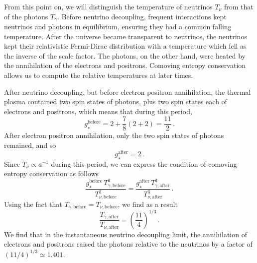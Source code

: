 From this point on, we will distinguish the temperature of neutrinos $T_\nu$ from that of the photons $T_\gamma$.  Before neutrino decoupling, frequent interactions kept neutrinos and photons in equilibrium, ensuring they had a common falling temperature.  After the universe became transparent to neutrinos, the neutrinos kept their relativistic Fermi-Dirac distribution with a temperature which fell as the inverse of the scale factor.  The photons, on the other hand, were heated by the annihilation of the electrons and positrons.  Comoving entropy conservation allows us to compute the relative temperatures at later times.

After neutrino decoupling, but before electron positron annihilation, the thermal plasma contained two spin states of photons, plus two spin states each of electrons and positrons, which means that during this period,
\begin{equation}
	g_{\star}^{\mathrm{before}} = 2 + \frac{7}{8}(2+2) = \frac{11}{2} \, .
\end{equation}
After electron positron annihilation, only the two spin states of photons remained, and so
\begin{equation}
	g_\star^{\mathrm{after}} = 2 \, .
\end{equation}
Since $T_\nu\propto a^{-1}$ during this period, we can express the condition of comoving entropy conservation as follows
\begin{equation}
	\frac{g_{\star}^{\mathrm{before}} \, T_{\gamma,\mathrm{before}}^3}{T_{\nu,\mathrm{before}}^3} = \frac{g_\star^{\mathrm{after}} \, T_{\gamma,\mathrm{after}}^3}{T_{\nu,\mathrm{after}}^3} \, .
\end{equation}
Using the fact that $T_{\gamma,\mathrm{before}} = T_{\nu,\mathrm{before}}$, we find as a result
\begin{equation}
	\frac{T_{\gamma,\mathrm{after}}}{T_{\nu,\mathrm{after}}} = \left(\frac{11}{4}\right)^{1/3} \, .
\end{equation}
We find that in the instantaneous neutrino decoupling limit, the annihilation of electrons and positrons raised the photons relative to the neutrinos by a factor of $(11/4)^{1/3}\simeq1.401$.

